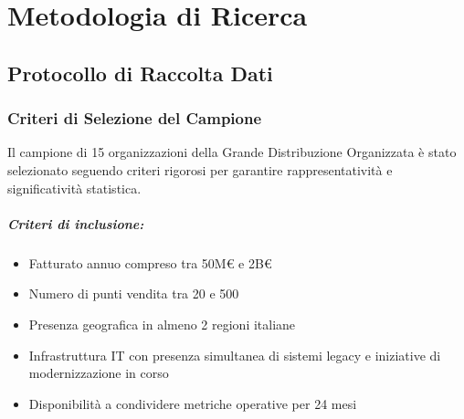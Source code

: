 
\appendix
\renewcommand{\thechapter}{\Alph{chapter}}


\chapter{Metodologia di Ricerca}
\label{app:metodologia}

\section{Protocollo di Raccolta Dati}

\subsection{Criteri di Selezione del Campione}

Il campione di 15 organizzazioni della Grande Distribuzione Organizzata è stato selezionato seguendo criteri rigorosi per garantire rappresentatività e significatività statistica.

\paragraph{Criteri di inclusione:}
\begin{itemize}
    \item Fatturato annuo compreso tra 50M€ e 2B€
    \item Numero di punti vendita tra 20 e 500
    \item Presenza geografica in almeno 2 regioni italiane
    \item Infrastruttura IT con presenza simultanea di sistemi legacy e iniziative di modernizzazione in corso
    \item Disponibilità a condividere metriche operative per 24 mesi
\end{itemize}

